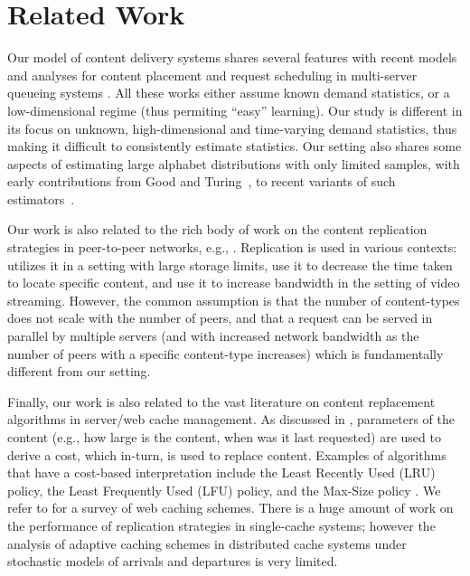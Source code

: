 \documentclass[10pt, conference, letterpaper]{IEEEtran}
\begin{document}
\section{Related Work}
\label{sec:related}
Our model of content delivery systems shares several features with
recent models and analyses for content placement and request
scheduling in multi-server queueing systems
\cite{LLM12,XT13,LLM13,Whitt07}. All these works either assume known
demand statistics, or a low-dimensional regime (thus permiting
``easy'' learning). Our study is different in its focus on unknown,
high-dimensional and time-varying demand statistics, thus making it
difficult to consistently estimate statistics.  Our setting also
shares some aspects of estimating large alphabet distributions with
only limited samples, with early contributions from Good and
Turing~\cite{Good53}, to recent variants of such
estimators~\cite{MS00,VV11}.







Our work is also related to the rich body of work on the content
replication strategies in peer-to-peer networks, e.g., \cite{TM13,
	KRR02, LC02, KRT07, WL12, ZFC13, CMGLT12, cluster02}.  Replication
is used in various contexts: \cite{TM13} utilizes it in a setting with
large storage limits, \cite{KRR02,LC02} use it to decrease the time
taken to locate specific content, and \cite{ZFC13,CMGLT12,cluster02}
use it to increase bandwidth in the setting of video
streaming.
However, the common assumption is that the number of content-types
does not scale with the number of peers, and that a request can be
served in parallel by multiple servers (and with increased network
bandwidth as the number of peers with a specific content-type
increases) which is fundamentally different from our setting.

Finally, our work is also related to the vast literature on content
replacement algorithms in server/web cache management. As discussed in
\cite{Wang99}, parameters of the content (e.g., how large is the
content, when was it last requested) are used to derive a cost, which
in-turn, is used to replace content.
Examples of
algorithms that have a cost-based interpretation include the Least
Recently Used (LRU) policy, the Least Frequently Used (LFU) policy,
and the Max-Size policy \cite{Size96}. 
We refer to \cite{Wang99} for a survey of web caching schemes. There
is a huge amount of work on the performance of replication strategies
in single-cache systems; however the analysis of adaptive caching
schemes in distributed cache systems under stochastic models of
arrivals and departures is very limited.
\end{document}
